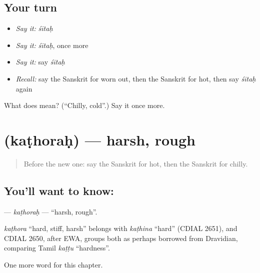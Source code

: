 \subsection*{Your turn}
\begin{itemize}
\raggedright
  \item \emph{Say it:} \emph{śītaḥ}
  \item \emph{Say it:} \emph{śītaḥ}, once more
  \item \emph{Say it:} say \emph{śītaḥ}
  \item \emph{Recall:} say the Sanskrit for worn out, then the Sanskrit for hot, then say \emph{śītaḥ} again
\end{itemize}

\begin{tcolorbox}[breakable,colback=teal!4,colframe=teal!35!black,title={Before you move on}]
What does  mean? (\textquotedblleft{}Chilly, cold\textquotedblright{}.) Say it once more.
\end{tcolorbox}
\section[\texorpdfstring{\sk{कठोरः} (kaṭhoraḥ)}{कठोरः (kaṭhoraḥ)}]{ (kaṭhoraḥ) — harsh, rough}

\label{lesson:SA-C155-kathorah}



\begin{quote}
Before the new one: say the Sanskrit for hot, then the Sanskrit for chilly.
\end{quote}

\subsection*{You'll want to know: }
\textbf{} — \emph{kaṭhoraḥ} — \textquotedblleft{}harsh, rough\textquotedblright{}.

\begin{cousinweb}
\emph{kaṭhora} \textquotedblleft{}hard, stiff, harsh\textquotedblright{} belongs with \emph{kaṭhina} \textquotedblleft{}hard\textquotedblright{} (CDIAL 2651), and CDIAL 2650, after EWA, groups both as perhaps borrowed from Dravidian, comparing Tamil \emph{kaṭṭu} \textquotedblleft{}hardness\textquotedblright{}.
\end{cousinweb}

\begin{grammarlens}[title={What you've built}]
One more word for this chapter.
\end{grammarlens}

